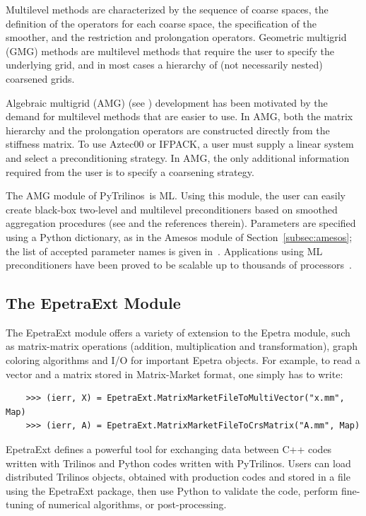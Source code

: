 \documentclass[acmtocl]{acmtrans2m}
\newcommand{\PyTrilinos}{{PyTrilinos}}
\begin{document}
Multilevel methods are characterized by the sequence of coarse spaces,
the definition of the operators for each coarse space, the
specification of the smoother, and the restriction and prolongation
operators.  Geometric multigrid (GMG) methods are multilevel methods
that require the user to specify the underlying grid, and in most
cases a hierarchy of (not necessarily nested) coarsened grids.

Algebraic multigrid (AMG) (see \cite[Section 8]{Briggs}) development
has been motivated by the demand for multilevel methods that are
easier to use.  In AMG, both the matrix hierarchy and the prolongation
operators are constructed directly from the stiffness matrix.  To use
Aztec00 or IFPACK, a user must supply a linear system and select a
preconditioning strategy.  In AMG, the only additional information
required from the user is to specify a coarsening strategy.

The AMG module of \PyTrilinos\ is ML.  Using this module, the user can
easily create black-box two-level and multilevel preconditioners based
on smoothed aggregation procedures (see
\cite{sala04analysis,brezina97robust} and the references therein).
Parameters are specified using a Python dictionary, as in the Amesos
module of Section~\ref{subsec:amesos}; the list of accepted parameter
names is given in~\cite{ml-guide}.  Applications using ML
preconditioners have been proved to be scalable up to thousands of
processors~\cite{ijnme,shadid-jcp-dd-precond}.

\subsection{The EpetraExt Module}
\label{subsec:epetraext}

The EpetraExt module offers a variety of extension to the Epetra
module, such as matrix-matrix operations (addition, multiplication and
transformation), graph coloring algorithms and I/O for important
Epetra objects.  For example, to read a vector and a matrix stored in
Matrix-Market format, one simply has to write:
\begin{verbatim}
    >>> (ierr, X) = EpetraExt.MatrixMarketFileToMultiVector("x.mm", Map)
    >>> (ierr, A) = EpetraExt.MatrixMarketFileToCrsMatrix("A.mm", Map)
\end{verbatim}
EpetraExt defines a powerful tool for exchanging data between C++
codes written with Trilinos and Python codes written with \PyTrilinos.
Users can load distributed Trilinos objects, obtained with production
codes and stored in a file using the EpetraExt package, then use
Python to validate the code, perform fine-tuning of numerical
algorithms, or post-processing.
\end{document}
